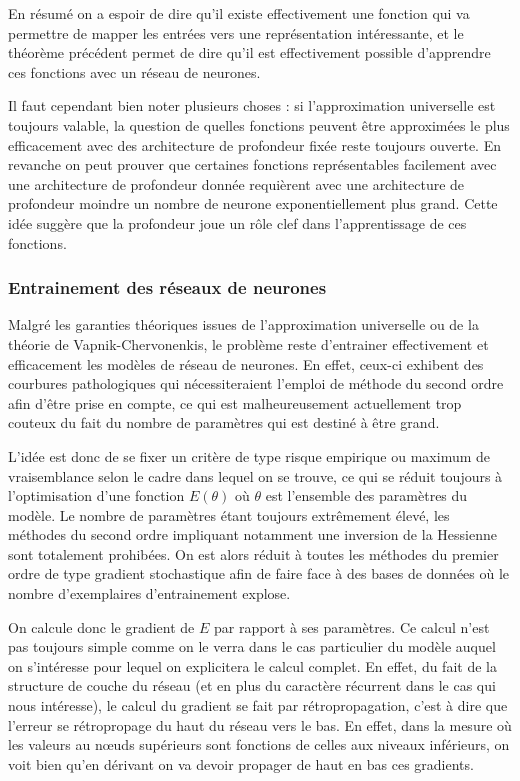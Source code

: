 \documentclass[conference]{IEEEtran}
\begin{document}
En résumé on a espoir de dire qu'il existe effectivement une fonction qui va permettre de mapper les entrées vers une représentation intéressante, et le théorème précédent permet de dire qu'il est effectivement possible d'apprendre ces fonctions avec un réseau de neurones.

Il faut cependant bien noter plusieurs choses : si l'approximation universelle est toujours valable, la question de quelles fonctions peuvent être approximées le plus efficacement avec des architecture de profondeur fixée reste toujours ouverte. En revanche on peut prouver que certaines fonctions représentables facilement avec une architecture de profondeur donnée requièrent avec une architecture de profondeur moindre un nombre de neurone exponentiellement plus grand. Cette idée suggère que la profondeur joue un rôle clef dans l'apprentissage de ces fonctions. 

\subsubsection{Entrainement des réseaux de neurones}
Malgré les garanties théoriques issues de l'approximation universelle ou de la théorie de Vapnik-Chervonenkis, le problème reste d'entrainer effectivement et efficacement les modèles de réseau de neurones. En effet, ceux-ci exhibent des courbures pathologiques qui nécessiteraient l'emploi de méthode du second ordre afin d'être prise en compte, ce qui est malheureusement actuellement trop couteux du fait du nombre de paramètres qui est destiné à être grand.

L'idée est donc de se fixer un critère de type risque empirique ou maximum de vraisemblance selon le cadre dans lequel on se trouve, ce qui se réduit toujours à l'optimisation d'une fonction $E(\theta)$ où $\theta$ est l'ensemble des paramètres du modèle. Le nombre de paramètres étant toujours extrêmement élevé, les méthodes du second ordre impliquant notamment une inversion de la Hessienne sont totalement prohibées. On est alors réduit à toutes les méthodes du premier ordre de type gradient stochastique afin de faire face à des bases de données où le nombre d'exemplaires d'entrainement explose. 


On calcule donc le gradient de $E$ par rapport à ses paramètres. Ce calcul n'est pas toujours simple comme on le verra dans le cas particulier du modèle auquel on s'intéresse pour lequel on explicitera le calcul complet. En effet, du fait de la structure de couche du réseau (et en plus du caractère récurrent dans le cas qui nous intéresse), le calcul du gradient se fait par rétropropagation, c'est à dire que l'erreur se rétropropage du haut du réseau vers le bas. En effet, dans la mesure où les valeurs au nœuds supérieurs sont fonctions de celles aux niveaux inférieurs, on voit bien qu'en dérivant on va devoir propager de haut en bas ces gradients.
\end{document}
